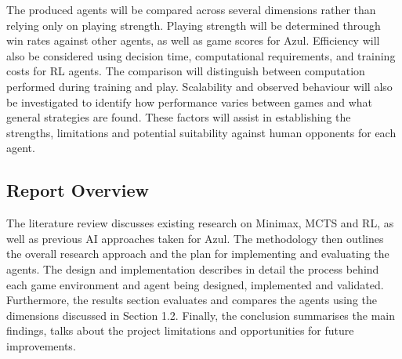 The produced agents will be compared across several dimensions rather than relying only on playing strength. Playing strength will be determined through win rates against other agents, as well as game scores for Azul. Efficiency will also be considered using decision time, computational requirements, and training costs for RL agents. The comparison will distinguish between computation performed during training and play. Scalability and observed behaviour will also be investigated to identify how performance varies between games and what general strategies are found. These factors will assist in establishing the strengths, limitations and potential suitability against human opponents for each agent. 


\subsection{Report Overview}
The literature review discusses existing research on Minimax, MCTS and RL, as well as previous AI approaches taken for Azul. The methodology then outlines the overall research approach and the plan for implementing and evaluating the agents. The design and implementation describes in detail the process behind each game environment and agent being designed, implemented and validated. Furthermore, the results section evaluates and compares the agents using the dimensions discussed in Section 1.2. Finally, the conclusion summarises the main findings, talks about the project limitations and opportunities for future improvements.
